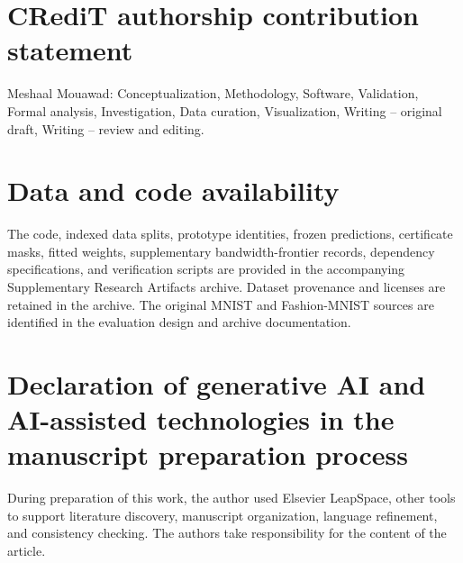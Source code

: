 \documentclass[preprint,12pt]{elsarticle}
\begin{document}
\section*{CRediT authorship contribution statement}
Meshaal Mouawad: Conceptualization, Methodology, Software, Validation, Formal analysis, Investigation, Data curation, Visualization, Writing -- original draft, Writing -- review and editing.

\section*{Data and code availability}
The code, indexed data splits, prototype identities, frozen predictions, certificate masks, fitted weights, supplementary bandwidth-frontier records, dependency specifications, and verification scripts are provided in the accompanying Supplementary Research Artifacts archive. Dataset provenance and licenses are retained in the archive. The original MNIST and Fashion-MNIST sources are identified in the evaluation design and archive documentation.

\section*{Declaration of generative AI and AI-assisted technologies in the manuscript preparation process}
During preparation of this work, the author used Elsevier LeapSpace, other tools to support literature discovery, manuscript organization, language refinement, and consistency checking. The authors take responsibility for the content of the article.


\begingroup\raggedright

\endgroup
\end{document}
